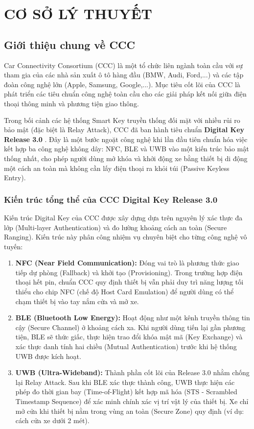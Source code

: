 \ifdefined\pdfadjustspacing{}\fi
\newpage
\chapter{\MakeUppercase{Cơ sở lý thuyết}} 
\section{Giới thiệu chung về CCC}
Car Connectivity Consortium (CCC) là một tổ chức liên ngành toàn cầu với sự tham gia của các nhà sản xuất ô tô hàng đầu (BMW, Audi, Ford,...) và các tập đoàn công nghệ lớn (Apple, Samsung, Google,...). Mục tiêu cốt lõi của CCC là phát triển các tiêu chuẩn công nghệ toàn cầu cho các giải pháp kết nối giữa điện thoại thông minh và phương tiện giao thông.

Trong bối cảnh các hệ thống Smart Key truyền thống đối mặt với nhiều rủi ro bảo mật (đặc biệt là Relay Attack), CCC đã ban hành tiêu chuẩn \textbf{Digital Key Release 3.0} \cite{ccc_digikey3}. Đây là một bước ngoặt công nghệ khi lần đầu tiên chuẩn hóa việc kết hợp ba công nghệ không dây: NFC, BLE và UWB vào một kiến trúc bảo mật thống nhất, cho phép người dùng mở khóa và khởi động xe bằng thiết bị di động một cách an toàn mà không cần lấy điện thoại ra khỏi túi (Passive Keyless Entry).

\subsection{Kiến trúc tổng thể của CCC Digital Key Release 3.0}
Kiến trúc Digital Key của CCC được xây dựng dựa trên nguyên lý xác thực đa lớp (Multi-layer Authentication) và đo lường khoảng cách an toàn (Secure Ranging). Kiến trúc này phân công nhiệm vụ chuyên biệt cho từng công nghệ vô tuyến:

\begin{enumerate}
    \item \textbf{NFC (Near Field Communication):} 
    Đóng vai trò là phương thức giao tiếp dự phòng (Fallback) và khởi tạo (Provisioning). Trong trường hợp điện thoại hết pin, chuẩn CCC quy định thiết bị vẫn phải duy trì năng lượng tối thiểu cho chip NFC (chế độ Host Card Emulation) để người dùng có thể chạm thiết bị vào tay nắm cửa và mở xe.
    
    \item \textbf{BLE (Bluetooth Low Energy):} 
    Hoạt động như một kênh truyền thông tin cậy (Secure Channel) ở khoảng cách xa. Khi người dùng tiến lại gần phương tiện, BLE sẽ thức giấc, thực hiện trao đổi khóa mật mã (Key Exchange) và xác thực danh tính hai chiều (Mutual Authentication) trước khi hệ thống UWB được kích hoạt.
    
    \item \textbf{UWB (Ultra-Wideband):} 
    Thành phần cốt lõi của Release 3.0 nhằm chống lại Relay Attack. Sau khi BLE xác thực thành công, UWB thực hiện các phép đo thời gian bay (Time-of-Flight) kết hợp mã hóa (STS - Scrambled Timestamp Sequence) để xác minh chính xác vị trí vật lý của thiết bị. Xe chỉ mở cửa khi thiết bị nằm trong vùng an toàn (Secure Zone) quy định (ví dụ: cách cửa xe dưới 2 mét).
\end{enumerate}

